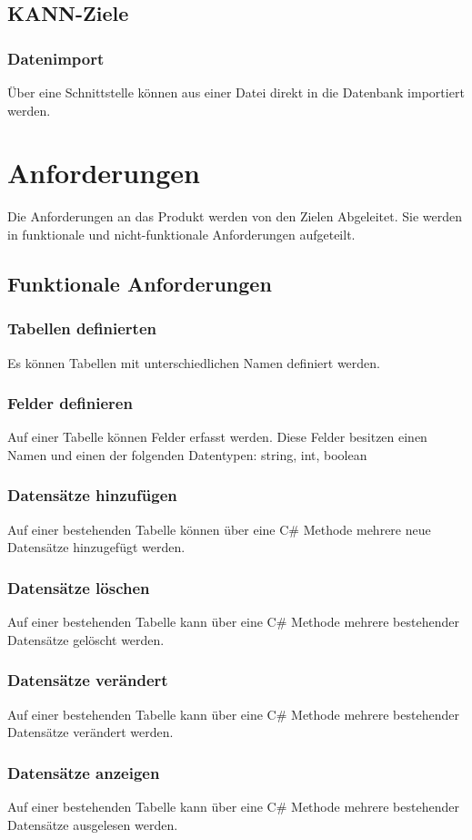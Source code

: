 \documentclass{article}
\begin{document}
\subsection{KANN-Ziele}
\subsubsection{Datenimport}
Über eine Schnittstelle können aus einer Datei direkt in die Datenbank importiert werden.
\section{Anforderungen}
Die Anforderungen an das Produkt werden von den Zielen Abgeleitet. Sie werden in funktionale und nicht-funktionale Anforderungen aufgeteilt.
\subsection{Funktionale Anforderungen}
\subsubsection{Tabellen definierten}
Es können Tabellen mit unterschiedlichen Namen definiert werden.
\subsubsection{Felder definieren}
Auf einer Tabelle können Felder erfasst werden. Diese Felder besitzen einen Namen und einen der folgenden Datentypen: string, int, boolean
\subsubsection{Datensätze hinzufügen}
Auf einer bestehenden Tabelle können über eine C\# Methode mehrere neue Datensätze hinzugefügt werden.
\subsubsection{Datensätze löschen}
Auf einer bestehenden Tabelle kann über eine C\# Methode mehrere bestehender Datensätze gelöscht werden.
\subsubsection{Datensätze verändert}
Auf einer bestehenden Tabelle kann über eine C\# Methode mehrere bestehender Datensätze verändert werden.
\subsubsection{Datensätze anzeigen}
Auf einer bestehenden Tabelle kann über eine C\# Methode mehrere bestehender Datensätze ausgelesen werden.
\end{document}
